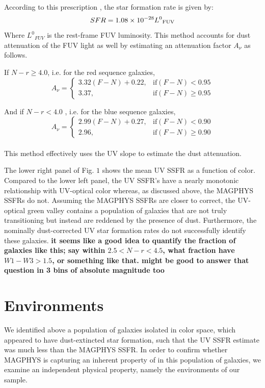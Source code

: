 \documentclass[iop]{emulateapj}
\begin{document}
According to this prescription \citep{salim_uv_2007}, the star formation 
rate is given by:
$$ SFR = 1.08 \times 10^{-28}{L^{0}}_{\rm FUV} $$
Where ${L^{0}}_{FUV}$ is the rest-frame FUV luminosity. This 
method accounts for dust attenuation of the FUV light as well by 
estimating an attenuation factor $A_{\nu}$ as 
follows.

If $N-r \geq 4.0$, i.e. for the red sequence galaxies,\\
$$ A_{\nu} = 
\begin{cases} 3.32 (F-N) + 0.22, & \text{if} (F-N) < 0.95\\
3.37, & \text{if} (F-N) \geq 0.95 
\end{cases}$$

And if $N-r < 4.0$ , i.e. for the blue sequence galaxies,\\
$$A_{\nu} = 
\begin{cases} 2.99(F-N) + 0.27, & \text{if}(F-N) < 0.90\\
2.96, & \text{if} (F-N) \geq 0.90 
\end{cases}$$\\

This method effectively uses the UV slope to estimate the 
dust attenuation.

The lower right panel of Fig. $1$ shows the mean UV SSFR as 
a function of color. Compared to the lower left panel, the UV 
SSFR's have a nearly monotonic relationship with UV-optical color 
whereas, as discussed above, the  MAGPHYS SSFRs do not. 
Assuming the MAGPHYS SSFRs are closer to correct, the UV-optical green 
valley contains a population of galaxies that are not truly transitioning 
but instead are reddened by the presence of dust. Furthermore, the nominally
dust-corrected UV star formation rates do not successfully identify
these galaxies. \textbf{it seems like a good idea to quantify the 
fraction of galaxies like this; say within $2.5 < N-r < 4.5$, what fraction
have $W1-W3 > 1.5$, or something like that. might be good to answer 
that question in 3 bins of absolute magnitude too}

\section{Environments}

We identified above a population of galaxies isolated in color space,
which appeared to have dust-extincted star formation, such that the UV SSFR estimate
was much less than the MAGPHYS SSFR.
In order to confirm whether MAGPHYS is capturing an inherent  property of
in this population of galaxies, we examine an independent physical property, 
namely the environments of our sample.\\
\end{document}
